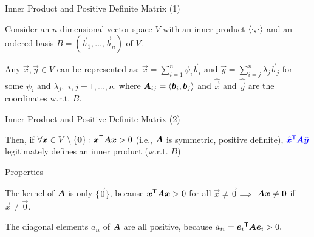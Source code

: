 \documentclass[handout,fleqn,aspectratio=169]{beamer}
\begin{document}
\begin{frame}{Inner Product and Positive Definite Matrix (1)}

\plitemsep 0.2in

\bci 
\item Consider an $n$-dimensional vector space $V$ with an inner product $\left\langle \cdot, \cdot \right\rangle$ and an ordered basis $B=(\vec{b}_1, \ldots, \vec{b}_n)$ of $V.$

\item Any $\vec{x},\vec{y} \in V$ can be represented as: $\vec{x}=\sum_{i=1}^n \psi_i \vec{b}_i$ and $\vec{y}=\sum_{i=j}^n \lambda_j \vec{b}_j$ for some $\psi_i$ and $\lambda_j,$ $i,j=1, \ldots, n.$
where $\bm{A}_{ij} = \left\langle \bm{b}_i, \bm{b}_j \right\rangle$ and $\hat{\vec{x}}$ and $\hat{\vec{y}}$ are the coordinates w.r.t. $B.$

\eci
\end{frame}

\begin{frame}{Inner Product and Positive Definite Matrix (2)}

\plitemsep 0.2in

\bci 

\item Then, if $\forall \bm{x} \in V \setminus \{\bm{0} \}: {\bm{x}}^{\mathsf{T}} \bm{A} \bm{x} > 0$ (i.e., $\bm{A}$ is symmetric, positive definite), ${\color{blue} {\hat{\bm{x}}}^{\mathsf{T}} \bm{A} \hat{\bm{y}}}$ legitimately defines an inner product (w.r.t. $B$)

\item Properties
\bci
\item The kernel of $\bm{A}$ is only $\{\vec{0} \}$, because ${\bm{x}}^{\mathsf{T}} \bm{A} \bm{x} > 0$ for all $\vec{x} \neq \vec{0}  \implies$ $\bm{A} \bm{x} \neq \bm{0}$ if $\vec{x} \neq \vec{0}.$
\item The diagonal elements $a_{ii}$ of $\bm{A}$ are all positive, because $a_{ii} = {\bm{e}_i}^{\mathsf{T}} \bm{A} \bm{e}_i >0.$
\eci
\eci
\end{frame}


\end{document}
